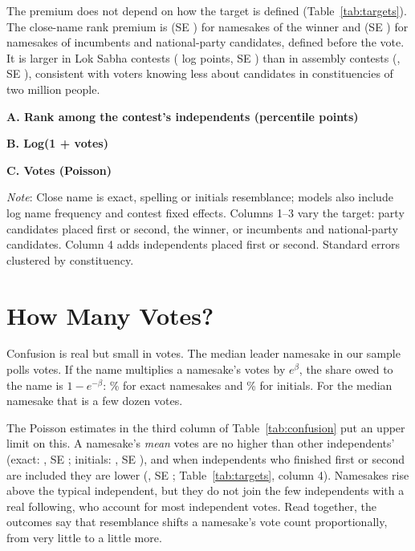\documentclass[11pt]{article}
\begin{document}
The premium does not depend on how the target is defined (Table~\ref{tab:targets}). The close-name rank premium is \tgWinRk{} (SE \tgWinRkSe) for namesakes of the winner and \tgExRk{} (SE \tgExRkSe) for namesakes of incumbents and national-party candidates, defined before the vote. It is larger in Lok Sabha contests (\tgLsLg{} log points, SE \tgLsLgSe) than in assembly contests (\tgAeLg, SE \tgAeLgSe), consistent with voters knowing less about candidates in constituencies of two million people.

\begin{table}[htbp]
\centering\small
\caption{The namesake premium across targets and samples.}
\label{tab:targets}
\textbf{A. Rank among the contest's independents (percentile points)}\par\smallskip
\par\medskip
\textbf{B. Log(1 + votes)}\par\smallskip
\par\medskip
\textbf{C. Votes (Poisson)}\par\smallskip

\par\smallskip\footnotesize
\emph{Note}: Close name is exact, spelling or initials resemblance; models also include log name frequency and contest fixed effects. Columns 1--3 vary the target: party candidates placed first or second, the winner, or incumbents and national-party candidates. Column 4 adds independents placed first or second. Standard errors clustered by constituency.
\end{table}

\section{How Many Votes?}

Confusion is real but small in votes. The median leader namesake in our sample polls \medNamesakeVotes{} votes. If the name multiplies a namesake's votes by $e^{\beta}$, the share owed to the name is $1-e^{-\beta}$: \divExact\% for exact namesakes and \divInit\% for initials. For the median namesake that is a few dozen votes.

The Poisson estimates in the third column of Table~\ref{tab:confusion} put an upper limit on this. A namesake's \emph{mean} votes are no higher than other independents' (exact: \poExact, SE \poExactSe; initials: \poInit, SE \poInitSe), and when independents who finished first or second are included they are lower (\tgAllPo, SE \tgAllPoSe; Table~\ref{tab:targets}, column 4). Namesakes rise above the typical independent, but they do not join the few independents with a real following, who account for most independent votes. Read together, the outcomes say that resemblance shifts a namesake's vote count proportionally, from very little to a little more.
\end{document}
